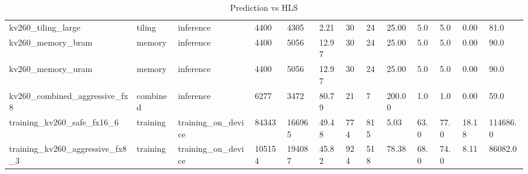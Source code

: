 \begin{table}[t]
\begin{tabular}{lllllllllllll}
kv260\_tiling\_large & tiling & inference & 4400 & 4305 & 2.21 & 30 & 24 & 25.00 & 5.0 & 5.0 & 0.00 & 81.0 \\
kv260\_memory\_bram & memory & inference & 4400 & 5056 & 12.97 & 30 & 24 & 25.00 & 5.0 & 5.0 & 0.00 & 90.0 \\
kv260\_memory\_uram & memory & inference & 4400 & 5056 & 12.97 & 30 & 24 & 25.00 & 5.0 & 5.0 & 0.00 & 90.0 \\
kv260\_combined\_aggressive\_fx8 & combined & inference & 6277 & 3472 & 80.79 & 21 & 7 & 200.00 & 1.0 & 1.0 & 0.00 & 59.0 \\
training\_kv260\_safe\_fx16\_6 & training & training\_on\_device & 84343 & 166965 & 49.48 & 774 & 815 & 5.03 & 63.0 & 77.0 & 18.18 & 114686.0 \\
training\_kv260\_aggressive\_fx8\_3 & training & training\_on\_device & 105154 & 194087 & 45.82 & 924 & 518 & 78.38 & 68.0 & 74.0 & 8.11 & 86082.0 \\
\hline
\end{tabular}
\caption{Prediction vs HLS}
\label{tab:table\_2\_prediction\_vs\_hls}
\end{table}

